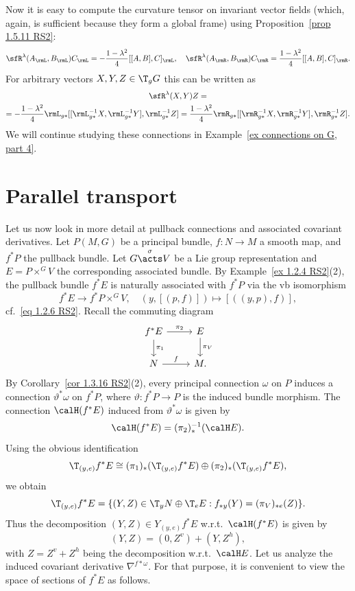 \begin{example}
    Now it is easy to compute the curvature tensor on invariant vector fields (which, again, is sufficient because they form a global frame) using Proposition~\ref{prop 1.5.11 RS2}:
    \[\sfR^\lambda(A_\rmL,B_\rmL)C_\rmL=-\frac{1-\lambda^2}{4}[[A,B],C]_\rmL,\quad \sfR^\lambda(A_\rmR,B_\rmR)C_\rmR=\frac{1-\lambda^2}{4}[[A,B],C]_\rmR.\]
    For arbitrary vectors $X,Y,Z\in \T_g G$ this can be written as
    \begin{multline}
        \sfR^\lambda(X,Y)Z=\\=-\frac{1-\lambda^2}{4}\rmL_{g\ast}[[\rmL_{g\ast}^{-1}X,\rmL_{g\ast}^{-1}Y],\rmL_{g\ast}^{-1}Z]=\frac{1-\lambda^2}{4}\rmR_{g\ast}[[\rmR_{g\ast}^{-1}X,\rmR_{g\ast}^{-1}Y],\rmR_{g\ast}^{-1}Z].
    \end{multline}
    We will continue studying these connections in Example~\ref{ex connections on G, part 4}.
\end{example}









\section{Parallel transport}


Let us now look in more detail at pullback connections and associated covariant derivatives. Let $P(M,G)$ be a principal bundle, $f:N\to M$ a smooth map, and $f^\ast P$ the pullback bundle. Let $G\overset{\sigma}{\acts}V$ be a Lie group representation and $E=P\times^G V$ the corresponding associated bundle. By Example~\ref{ex 1.2.4 RS2}(2), the pullback bundle $f^\ast E$ is naturally associated with $f^\ast P$ via the \gls{vb} isomorphism
\[f^\ast E\to f^\ast P\times^G V,\quad (y,[(p,f)])\mapsto [((y,p),f)],\]
cf.\ \eqref{eq 1.2.6 RS2}. 
Recall the commuting diagram
\[\begin{tikzcd}
    f^\ast E\arrow[r,"\pi_2"]\arrow[d,"\pi_1"]& E\arrow[d,"\pi_V"]\\
    N\arrow[r,"f"]&M.
\end{tikzcd}\]
By Corollary~\ref{cor 1.3.16 RS2}(2), every principal connection $\omega$ on $P$ induces a connection $\vartheta^\ast\omega$ on $f^\ast P$, where $\vartheta: f^\ast P\to P$ is the induced bundle morphism. The connection $\calH (f^\ast E)$ induced from $\vartheta^\ast\omega$ is given by
\[\calH (f^\ast E)=(\pi_2)_\ast^{-1}(\calH E).\]
Using the obvious identification
\[\T_{(y,e)}f^\ast E\cong (\pi_1)_\ast (\T_{(y,e)}f^\ast E)\oplus (\pi_2)_\ast(\T_{(y,e)}f^\ast E),\]
we obtain
\[\T_{(y,e)}f^\ast E=\{(Y,Z)\in \T_y N\oplus \T_e E:f_{\ast y}(Y)=(\pi_V)_{\ast e}(Z)\}.\]
Thus the decomposition $(Y,Z)\in Y_{(y,e)}f^\ast E$ w.r.t.\ $\calH (f^\ast E)$ is given by
\[(Y,Z)=(0,Z^v)+(Y,Z^h),\label{eq 1.5.15 RS2}\]
with $Z=Z^v+Z^h$ being the decomposition w.r.t.\ $\calH E$. Let us analyze the induced covariant derivative $\nabla^{f\ast \omega}$. For that purpose, it is convenient to view the space of sections of $f^\ast E$ as follows.

